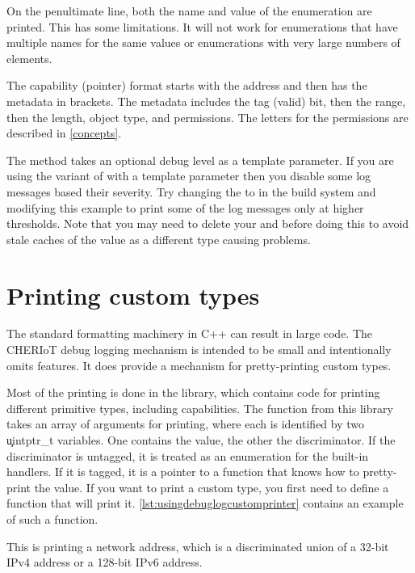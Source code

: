 {On the penultimate line, both the name and value of the enumeration are printed.
This has some limitations.
It will not work for enumerations that have multiple names for the same values or enumerations with very large numbers of elements.

The capability (pointer) format starts with the address and then has the metadata in brackets.
The metadata includes the tag (valid) bit, then the range, then the length, object type, and permissions.
The letters for the permissions are described in \ref{concepts}.

The  method takes an optional debug level as a template parameter.
If you are using the variant of  with a  template parameter then you disable some log messages based their severity.
Try changing the  to  in the build system and modifying this example to print some of the log messages only at higher thresholds.
Note that you may need to delete your  and  before doing this to avoid stale caches of the value as a different type causing problems.

\section{Printing custom types}

The standard formatting machinery in C++ can result in large code.
The CHERIoT debug logging mechanism is intended to be small and intentionally omits features.
It does provide a mechanism for pretty-printing custom types.

Most of the printing is done in the  library, which contains code for printing different primitive types, including capabilities.
The function from this library takes an array of arguments for printing, where each is identified by two \c{uintptr_t} variables.
One contains the value, the other the discriminator.
If the discriminator is untagged, it is treated as an enumeration for the built-in handlers.
If it is tagged, it is a pointer to a function that knows how to pretty-print the value.
If you want to print a custom type, you first need to define a function that will print it.
\ref{lst:usingdebuglogcustomprinter} contains an example of such a function.

This is printing a network address, which is a discriminated union of a 32-bit IPv4 address or a 128-bit IPv6 address.

\codelisting[filename=examples/debug_helpers/example.cc,marker=printer,label=lst:usingdebuglogcustomprinter,caption="Defining a print function for a custom type."]{}

}
